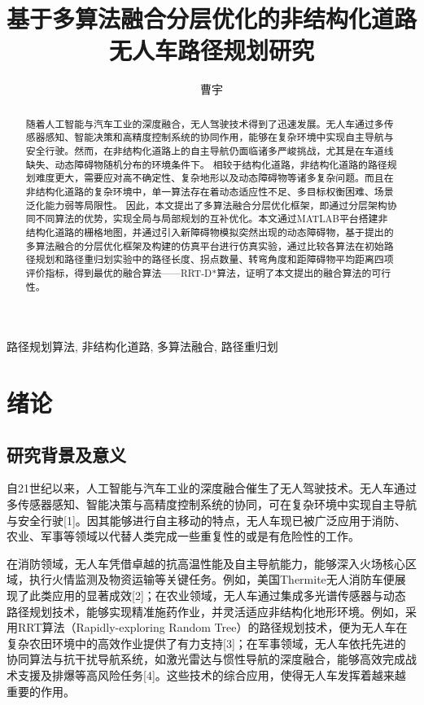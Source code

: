 \documentclass[lettersize,journal]{IEEEtran}
\begin{document}
\title{基于多算法融合分层优化的非结构化道路无人车路径规划研究}

\author{曹宇}



\maketitle

\begin{abstract}
  随着人工智能与汽车工业的深度融合，无人驾驶技术得到了迅速发展。无人车通过多传感器感知、智能决策和高精度控制系统的协同作用，能够在复杂环境中实现自主导航与安全行驶。然而，在非结构化道路上的自主导航仍面临诸多严峻挑战，尤其是在车道线缺失、动态障碍物随机分布的环境条件下。
  相较于结构化道路，非结构化道路的路径规划难度更大，需要应对高不确定性、复杂地形以及动态障碍物等诸多复杂问题。而且在非结构化道路的复杂环境中，单一算法存在着动态适应性不足、多目标权衡困难、场景泛化能力弱等局限性。
  因此，本文提出了多算法融合分层优化框架，即通过分层架构协同不同算法的优势，实现全局与局部规划的互补优化。本文通过MATLAB平台搭建非结构化道路的栅格地图，并通过引入新障碍物模拟突然出现的动态障碍物，基于提出的多算法融合的分层优化框架及构建的仿真平台进行仿真实验，通过比较各算法在初始路径规划和路径重归划实验中的路径长度、拐点数量、转弯角度和距障碍物平均距离四项评价指标，得到最优的融合算法——RRT-D*算法，证明了本文提出的融合算法的可行性。
\end{abstract}

\begin{IEEEkeywords}
  路径规划算法, 非结构化道路, 多算法融合, 路径重归划
\end{IEEEkeywords}

\section{绪论}
\subsection{研究背景及意义}

自21世纪以来，人工智能与汽车工业的深度融合催生了无人驾驶技术。无人车通过多传感器感知、智能决策与高精度控制系统的协同，可在复杂环境中实现自主导航与安全行驶[1]。因其能够进行自主移动的特点，无人车现已被广泛应用于消防、农业、军事等领域以代替人类完成一些重复性的或是有危险性的工作。

在消防领域，无人车凭借卓越的抗高温性能及自主导航能力，能够深入火场核心区域，执行火情监测及物资运输等关键任务。例如，美国Thermite无人消防车便展现了此类应用的显著成效[2]；在农业领域，无人车通过集成多光谱传感器与动态路径规划技术，能够实现精准施药作业，并灵活适应非结构化地形环境。例如，采用RRT算法（Rapidly-exploring Random Tree）的路径规划技术，便为无人车在复杂农田环境中的高效作业提供了有力支持[3]；在军事领域，无人车依托先进的协同算法与抗干扰导航系统，如激光雷达与惯性导航的深度融合，能够高效完成战术支援及排爆等高风险任务[4]。这些技术的综合应用，使得无人车发挥着越来越重要的作用。
\end{document}

